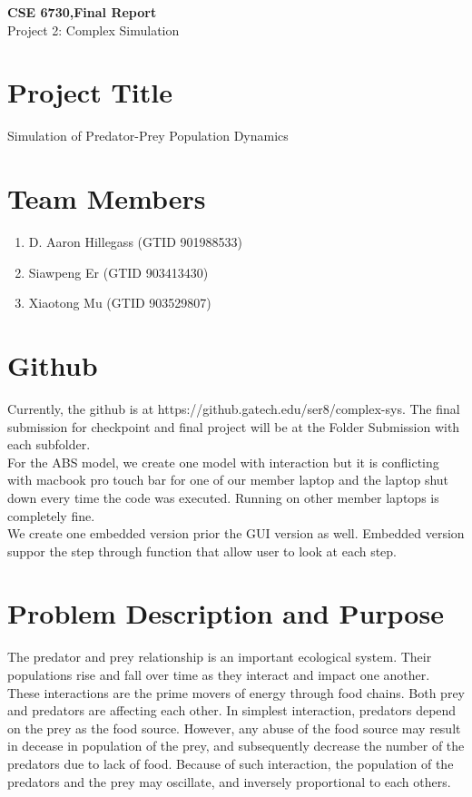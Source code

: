 \documentclass{article}
\begin{document}
	\begin{center}
		
		\LARGE{\textbf{CSE 6730,Final Report}} \\
		\vspace{1em}
		\Large{Project 2: Complex Simulation} \\
		
	\end{center}
	\begin{normalsize}
		
		\section{Project Title}
		
		Simulation of Predator-Prey Population Dynamics 
		
		\section{Team Members}
		
		\begin{enumerate}
			\item D. Aaron Hillegass (GTID 901988533)
			\item Siawpeng Er (GTID 903413430)
			\item Xiaotong Mu (GTID 903529807)
		\end{enumerate}
	
		\section{Github}
		Currently, the github is at https://github.gatech.edu/ser8/complex-sys.
		The final submission for checkpoint and final project will be at the Folder Submission with each subfolder.\\
		For the ABS model, we create one model with interaction but it is conflicting with macbook pro touch bar for one of our member laptop and the laptop shut down every time the code was executed. Running on other member laptops is completely fine. \\
		We create one embedded version prior the GUI version as well. Embedded version suppor the step through function that allow user to look at each step.

		
		\section{Problem Description and Purpose}
		The predator and prey relationship is an important ecological system. Their populations rise and fall over time as they interact and impact one another. These interactions are the prime movers of energy through food chains. Both prey and predators are affecting each other. \cite{laham_2012_a}In simplest interaction, predators depend on the prey as the food source. However, any abuse of the food source may result in decease in population of the prey, and subsequently decrease the number of the predators due to lack of food. Because of such interaction, the population of the predators and the prey may oscillate, and inversely proportional to each others.\cite{obaid_2013_the}\
		

\end{normalsize}
\end{document}
